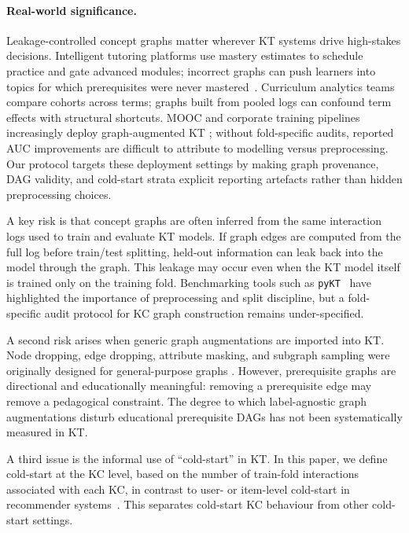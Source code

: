 \documentclass[runningheads]{llncs}
\begin{document}
\paragraph{Real-world significance.}
Leakage-controlled concept graphs matter wherever KT systems drive
high-stakes decisions. Intelligent tutoring platforms use mastery
estimates to schedule practice and gate advanced modules; incorrect
graphs can push learners into topics for which prerequisites were never
mastered~\cite{heffernan2006assist,junyi_dataset}. Curriculum analytics
teams compare cohorts across terms; graphs built from pooled logs can
confound term effects with structural shortcuts. MOOC and corporate
training pipelines increasingly deploy graph-augmented KT
\cite{choi2020ednet,xes3g5m2023}; without fold-specific audits,
reported AUC improvements are difficult to attribute to modelling
versus preprocessing. Our protocol targets these deployment settings by
making graph provenance, DAG validity, and cold-start strata explicit
reporting artefacts rather than hidden preprocessing choices.

A key risk is that concept graphs are often inferred from the same
interaction logs used to train and evaluate KT models. If graph edges
are computed from the full log before train/test splitting, held-out
information can leak back into the model through the graph. This leakage
may occur even when the KT model itself is trained only on the training
fold. Benchmarking tools such as \texttt{pyKT}~\cite{liu2022pykt} have
highlighted the importance of preprocessing and split discipline, but a
fold-specific audit protocol for KC graph construction remains
under-specified.

A second risk arises when generic graph augmentations are imported into
KT. Node dropping, edge dropping, attribute masking, and subgraph
sampling were originally designed for general-purpose graphs
\cite{you2020graphcl,zhu2021gca,xia2022simgrace,thakoor2021bgrl,
velickovic2018dgi,hassani2020mvgrl}. However, prerequisite graphs are
directional and educationally meaningful: removing a prerequisite edge
may remove a pedagogical constraint. The degree to which label-agnostic
graph augmentations disturb educational prerequisite DAGs has not been
systematically measured in KT.

A third issue is the informal use of ``cold-start'' in KT. In this
paper, we define cold-start at the KC level, based on the number of
train-fold interactions associated with each KC, in contrast to user- or
item-level cold-start in recommender systems~\cite{schein2002coldstart}.
This separates cold-start KC behaviour from other cold-start settings.
\end{document}
